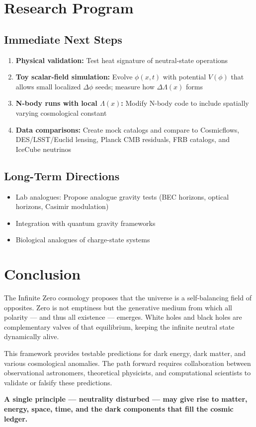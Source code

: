 \documentclass[11pt,a4paper]{article}
\begin{document}
\section{Research Program}

\subsection{Immediate Next Steps}

\begin{enumerate}
\item \textbf{Physical validation:} Test heat signature of neutral-state operations
\item \textbf{Toy scalar-field simulation:} Evolve $\phi(x,t)$ with potential $V(\phi)$ that allows small localized $\Delta\phi$ seeds; measure how $\Delta\Lambda(x)$ forms
\item \textbf{N-body runs with local $\Lambda(x)$:} Modify N-body code to include spatially varying cosmological constant
\item \textbf{Data comparisons:} Create mock catalogs and compare to Cosmicflows, DES/LSST/Euclid lensing, Planck CMB residuals, FRB catalogs, and IceCube neutrinos
\end{enumerate}

\subsection{Long-Term Directions}

\begin{itemize}
\item Lab analogues: Propose analogue gravity tests (BEC horizons, optical horizons, Casimir modulation)
\item Integration with quantum gravity frameworks
\item Biological analogues of charge-state systems
\end{itemize}

\section{Conclusion}

The Infinite Zero cosmology proposes that the universe is a self-balancing field of opposites. Zero is not emptiness but the generative medium from which all polarity --- and thus all existence --- emerges. White holes and black holes are complementary valves of that equilibrium, keeping the infinite neutral state dynamically alive.

This framework provides testable predictions for dark energy, dark matter, and various cosmological anomalies. The path forward requires collaboration between observational astronomers, theoretical physicists, and computational scientists to validate or falsify these predictions.

\textbf{A single principle --- neutrality disturbed --- may give rise to matter, energy, space, time, and the dark components that fill the cosmic ledger.}


\end{document}
